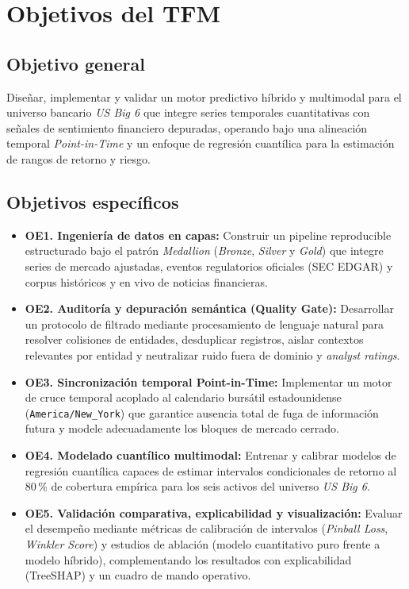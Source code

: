 \section{Objetivos del TFM}
\subsection*{Objetivo general}
Diseñar, implementar y validar un motor predictivo híbrido y multimodal para el universo bancario \textit{US Big 6} que integre series temporales cuantitativas con señales de sentimiento financiero depuradas, operando bajo una alineación temporal \textit{Point-in-Time} y un enfoque de regresión cuantílica para la estimación de rangos de retorno y riesgo.

\subsection*{Objetivos específicos}
\begin{itemize}
    \item \textbf{OE1. Ingeniería de datos en capas:} Construir un pipeline reproducible estructurado bajo el patrón \textit{Medallion} (\textit{Bronze}, \textit{Silver} y \textit{Gold}) que integre series de mercado ajustadas, eventos regulatorios oficiales (SEC EDGAR) y corpus históricos y en vivo de noticias financieras.
    \item \textbf{OE2. Auditoría y depuración semántica (Quality Gate):} Desarrollar un protocolo de filtrado mediante procesamiento de lenguaje natural para resolver colisiones de entidades, desduplicar registros, aislar contextos relevantes por entidad y neutralizar ruido fuera de dominio y \textit{analyst ratings}.
    \item \textbf{OE3. Sincronización temporal Point-in-Time:} Implementar un motor de cruce temporal acoplado al calendario bursátil estadounidense (\texttt{America/New\_York}) que garantice ausencia total de fuga de información futura y modele adecuadamente los bloques de mercado cerrado.
    \item \textbf{OE4. Modelado cuantílico multimodal:} Entrenar y calibrar modelos de regresión cuantílica capaces de estimar intervalos condicionales de retorno al 80\,\% de cobertura empírica para los seis activos del universo \textit{US Big 6}.
    \item \textbf{OE5. Validación comparativa, explicabilidad y visualización:} Evaluar el desempeño mediante métricas de calibración de intervalos (\textit{Pinball Loss}, \textit{Winkler Score}) y estudios de ablación (modelo cuantitativo puro frente a modelo híbrido), complementando los resultados con explicabilidad (TreeSHAP) y un cuadro de mando operativo.
\end{itemize}

